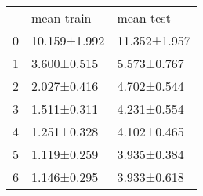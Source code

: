 \begin{tabular}{lll}
 & mean train & mean test \\
0 & 10.159±1.992 & 11.352±1.957 \\
1 & 3.600±0.515 & 5.573±0.767 \\
2 & 2.027±0.416 & 4.702±0.544 \\
3 & 1.511±0.311 & 4.231±0.554 \\
4 & 1.251±0.328 & 4.102±0.465 \\
5 & 1.119±0.259 & 3.935±0.384 \\
6 & 1.146±0.295 & 3.933±0.618 \\
\end{tabular}
